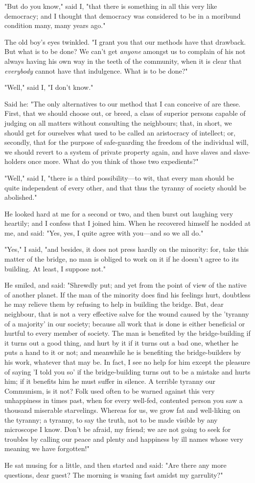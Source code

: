 "But do you know," said I, "that there is something in all this very
like democracy; and I thought that democracy was considered to be in a
moribund condition many, many years ago."

The old boy's eyes twinkled. "I grant you that our methods have that
drawback. But what is to be done? We can't get \emph{anyone} amongst us
to complain of his not always having his own way in the teeth of the
community, when it is clear that \emph{everybody} cannot have that
indulgence. What is to be done?"

"Well," said I, "I don't know."

Said he: "The only alternatives to our method that I can conceive of are
these. First, that we should choose out, or breed, a class of superior
persons capable of judging on all matters without consulting the
neighbours; that, in short, we should get for ourselves what used to be
called an aristocracy of intellect; or, secondly, that for the purpose
of safe-guarding the freedom of the individual will, we should revert to
a system of private property again, and have slaves and slave-holders
once more. What do you think of those two expedients?"

"Well," said I, "there is a third possibility---to wit, that every man
should be quite independent of every other, and that thus the tyranny of
society should be abolished."

He looked hard at me for a second or two, and then burst out laughing
very heartily; and I confess that I joined him. When he recovered
himself he nodded at me, and said: "Yes, yes, I quite agree with
you---and so we all do."

"Yes," I said, "and besides, it does not press hardly on the minority:
for, take this matter of the bridge, no man is obliged to work on it if
he doesn't agree to its building. At least, I suppose not."

He smiled, and said: "Shrewdly put; and yet from the point of view of
the native of another planet. If the man of the minority does find his
feelings hurt, doubtless he may relieve them by refusing to help in
building the bridge. But, dear neighbour, that is not a very effective
salve for the wound caused by the 'tyranny of a majority' in our
society; because all work that is done is either beneficial or hurtful
to every member of society. The man is benefited by the bridge-building
if it turns out a good thing, and hurt by it if it turns out a bad one,
whether he puts a hand to it or not; and meanwhile he is benefiting the
bridge-builders by his work, whatever that may be. In fact, I see no
help for him except the pleasure of saying 'I told you so' if the
bridge-building turns out to be a mistake and hurts him; if it benefits
him he must suffer in silence. A terrible tyranny our Communism, is it
not? Folk used often to be warned against this very unhappiness in times
past, when for every well-fed, contented person you saw a thousand
miserable starvelings. Whereas for us, we grow fat and well-liking on
the tyranny; a tyranny, to say the truth, not to be made visible by any
microscope I know. Don't be afraid, my friend; we are not going to seek
for troubles by calling our peace and plenty and happiness by ill names
whose very meaning we have forgotten!"

He sat musing for a little, and then started and said: "Are there any
more questions, dear guest? The morning is waning fast amidst my
garrulity?"
